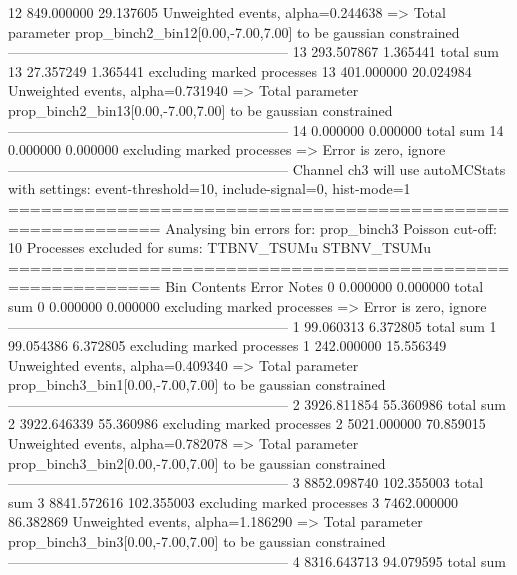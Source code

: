 12         849.000000      29.137605       Unweighted events, alpha=0.244638
  => Total parameter prop_binch2_bin12[0.00,-7.00,7.00] to be gaussian constrained
------------------------------------------------------------
13         293.507867      1.365441        total sum                     
13         27.357249       1.365441        excluding marked processes    
13         401.000000      20.024984       Unweighted events, alpha=0.731940
  => Total parameter prop_binch2_bin13[0.00,-7.00,7.00] to be gaussian constrained
------------------------------------------------------------
14         0.000000        0.000000        total sum                     
14         0.000000        0.000000        excluding marked processes    
  => Error is zero, ignore      
------------------------------------------------------------
Channel ch3 will use autoMCStats with settings: event-threshold=10, include-signal=0, hist-mode=1
============================================================
Analysing bin errors for: prop_binch3
Poisson cut-off: 10
Processes excluded for sums: TTBNV_TSUMu STBNV_TSUMu
============================================================
Bin        Contents        Error           Notes                         
0          0.000000        0.000000        total sum                     
0          0.000000        0.000000        excluding marked processes    
  => Error is zero, ignore      
------------------------------------------------------------
1          99.060313       6.372805        total sum                     
1          99.054386       6.372805        excluding marked processes    
1          242.000000      15.556349       Unweighted events, alpha=0.409340
  => Total parameter prop_binch3_bin1[0.00,-7.00,7.00] to be gaussian constrained
------------------------------------------------------------
2          3926.811854     55.360986       total sum                     
2          3922.646339     55.360986       excluding marked processes    
2          5021.000000     70.859015       Unweighted events, alpha=0.782078
  => Total parameter prop_binch3_bin2[0.00,-7.00,7.00] to be gaussian constrained
------------------------------------------------------------
3          8852.098740     102.355003      total sum                     
3          8841.572616     102.355003      excluding marked processes    
3          7462.000000     86.382869       Unweighted events, alpha=1.186290
  => Total parameter prop_binch3_bin3[0.00,-7.00,7.00] to be gaussian constrained
------------------------------------------------------------
4          8316.643713     94.079595       total sum                     
